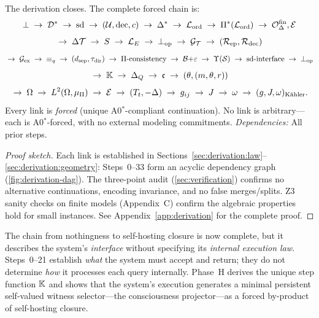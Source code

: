 \begin{theorem}
\label{thm:final-chain}
The derivation closes.  The complete forced chain is:
\[
  \bot \;\to\; \mathcal{D}^* \;\to\; \mathrm{sd} \;\to\; (\mathcal{U}, \mathrm{dec}, c)
    \;\to\; \Delta^* \;\to\; \mathcal{L}_{\mathrm{ord}} \;\to\; \Pi^*(\mathcal{L}_{\mathrm{ord}}) \;\to\;
    \mathcal{O}^{\mathrm{fin}}_\Delta, \mathcal{E}
\]
\[
  \;\to\; \Delta\mathcal{T} \;\to\; S \;\to\; \mathcal{L}_E \;\to\; \bot_{\mathrm{op}}
    \;\to\; \mathcal{G}_{\mathcal{T}} \;\to\; (\mathcal{R}_{\mathrm{ep}}, \mathcal{R}_{\mathrm{dec}})
\]
\[
  \;\to\; \mathcal{G}_{\mathrm{ex}} \;\to\; {\equiv_q} \;\to\; (d_{\mathrm{sep}}, \tau_{\mathrm{dir}})
    \;\to\; \Pi\text{-consistency} \;\to\; \mathcal{B}{+}\varepsilon \;\to\;
    \Upsilon(\mathcal{S}) \;\to\; \mathrm{sd}\text{-interface} \;\to\; \bot_{\mathrm{op}}
\]
\[
  \;\to\; \mathbb{K} \;\to\; \Delta_{Q} \;\to\; \mathfrak{c}
    \;\to\; (\theta, (m, \theta, r))
\]
\[
  \;\to\; \Omega \;\to\; L^2(\Omega, \mu_\Pi) \;\to\; \mathcal{E}
    \;\to\; (T_t, -\Delta) \;\to\; g_{ij} \;\to\; J \;\to\; \omega
    \;\to\; (g, J, \omega)_{\mathrm{K\ddot{a}hler}}.
\]
Every link is \emph{forced} (unique A0$^*$-compliant continuation).  No link is arbitrary---each is A0$^*$-forced, with no external modeling commitments.
\emph{Dependencies:} All prior steps.
\begin{proof}[Proof sketch]
Each link is established in Sections~\ref{sec:derivation:law}--\ref{sec:derivation:geometry}: Steps~0--33 form an acyclic dependency graph (\cref{fig:derivation-dag}).  The three-point audit (\cref{sec:verification}) confirms no alternative continuations, encoding invariance, and no false merges/splits.  Z3 sanity checks on finite models (Appendix~C) confirm the algebraic properties hold for small instances.
See Appendix~\ref{app:derivation} for the complete proof.
\end{proof}
\end{theorem}

\bigskip\noindent
The chain from nothingness to self-hosting closure is now complete, but it
describes the system's \emph{interface} without specifying its
\emph{internal execution law}.  Steps~0--21 establish \emph{what} the
system must accept and return; they do not determine \emph{how} it
processes each query internally.  Phase~H derives the unique step function
$\mathbb{K}$ and shows that the system's execution generates a minimal
persistent self-valued witness selector---the consciousness
projector---as a forced by-product of self-hosting closure.

